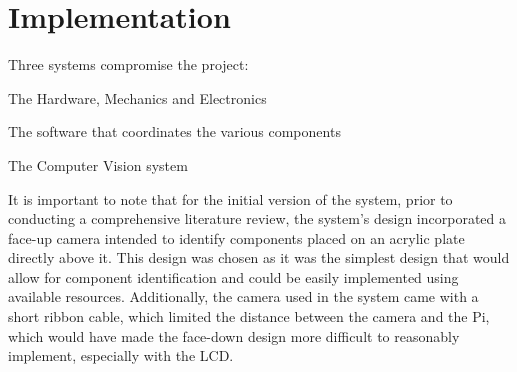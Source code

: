 \section{Implementation}
Three systems compromise the project:
\begin{mylist}
  \item The Hardware, Mechanics and Electronics
  \item The software that coordinates the various components
  \item The Computer Vision system
\end{mylist}

\noindent
It is important to note that for the initial version of the system, prior to conducting a comprehensive literature review,
the system's design incorporated a face-up camera intended to identify components placed on an acrylic plate directly above it.
This design was chosen as it was the simplest design that would allow for component identification and could 
be easily implemented using available resources. Additionally, the camera used in the system came with
a short ribbon cable, which limited the distance between the camera and the Pi, which would have made the face-down
design more difficult to reasonably implement, especially with the LCD.


